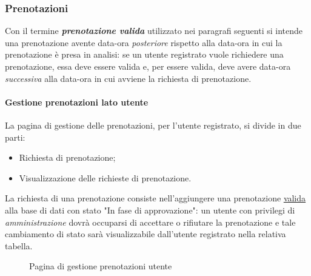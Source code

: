 \documentclass[]{article}
\begin{document}
\subsubsection{Prenotazioni}
\label{prenotazioni:valida}
Con il termine \textbf{\textit{prenotazione valida}} utilizzato nei paragrafi seguenti si intende una prenotazione avente data-ora \textit{posteriore} rispetto alla data-ora in cui la prenotazione è presa in analisi: se un utente registrato vuole richiedere una prenotazione, essa deve essere valida e, per essere valida, deve avere data-ora \textit{successiva} alla data-ora in cui avviene la richiesta di prenotazione.

\paragraph*{Gestione prenotazioni lato utente}
La pagina di gestione delle prenotazioni, per l'utente registrato, si divide in due parti:
\begin{itemize}
	\item Richiesta di prenotazione;
	\item Visualizzazione delle richieste di prenotazione.
\end{itemize}
La richiesta di una prenotazione consiste nell'aggiungere una prenotazione \hyperref[prenotazioni:valida]{\underline{valida}} alla base di dati con stato "In fase di approvazione": un utente con privilegi di \textit{amministrazione} dovrà occuparsi di accettare o rifiutare la prenotazione e tale cambiamento di stato sarà visualizzabile dall'utente registrato nella relativa tabella.
\begin{figure}[H]
	\centering
	\caption{Pagina di gestione prenotazioni utente}
\end{figure}
\end{document}
